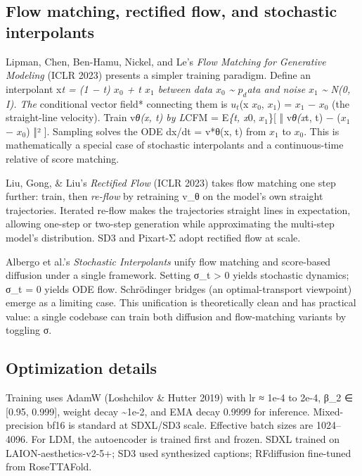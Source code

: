 \documentclass{article}
\begin{document}
\subsection{Flow matching, rectified flow, and stochastic interpolants}\label{flow-matching-rectified-flow-and-stochastic-interpolants}

Lipman, Chen, Ben-Hamu, Nickel, and Le's \emph{Flow Matching for Generative Modeling} (ICLR 2023) presents a simpler training paradigm. Define an interpolant x\emph{t = (1 − t) \(x_0\) + t \(x_1\) between data \(x_0\) \textasciitilde{} \(p_d\)ata and noise \(x_1\) \textasciitilde{} N(0, I). The }conditional vector field* connecting them is \(u_t\)(x \textbar{} \(x_0\), \(x_1\)) = \(x_1\) − \(x_0\) (the straight-line velocity). Train v\emph{θ(x, t) by L}CFM = E\emph{\{t, x}0, \(x_1\)\}{[} ‖ v\emph{θ(x}t, t) − (\(x_1\) − \(x_0\)) ‖² {]}. Sampling solves the ODE dx/dt = v*θ(x, t) from \(x_1\) to \(x_0\). This is mathematically a special case of stochastic interpolants \citep{albergo2023stochasticinterpol} and a continuous-time relative of score matching.

Liu, Gong, \& Liu's \emph{Rectified Flow} (ICLR 2023) takes flow matching one step further: train, then \emph{re-flow} by retraining v\_θ on the model's own straight trajectories. Iterated re-flow makes the trajectories straight lines in expectation, allowing one-step or two-step generation while approximating the multi-step model's distribution. SD3 and Pixart-Σ adopt rectified flow at scale.

Albergo et al.'s \emph{Stochastic Interpolants} unify flow matching and score-based diffusion under a single framework. Setting σ\_t \textgreater{} 0 yields stochastic dynamics; σ\_t = 0 yields ODE flow. Schrödinger bridges (an optimal-transport viewpoint) emerge as a limiting case. This unification is theoretically clean and has practical value: a single codebase can train both diffusion and flow-matching variants by toggling σ.

\subsection{Optimization details}\label{optimization-details}

Training uses AdamW (Loshchilov \& Hutter 2019) with lr ≈ 1e-4 to 2e-4, β\_2 ∈ {[}0.95, 0.999{]}, weight decay \textasciitilde1e-2, and EMA decay 0.9999 for inference. Mixed-precision bf16 is standard at SDXL/SD3 scale. Effective batch sizes are 1024--4096. For LDM, the autoencoder is trained first and frozen. SDXL trained on LAION-aesthetics-v2-5+; SD3 used synthesized captions; RFdiffusion fine-tuned from RoseTTAFold.
\end{document}
